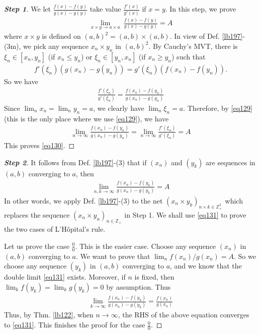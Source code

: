 \documentclass[12pt,b5paper,notitlepage]{article}
\theoremstyle{definition}
\theoremstyle{plain}
\newcommand{\Zbb}{\mathbb Z}
\newcommand{\dps}{\displaystyle}
\numberwithin{equation}{section}
\begin{document}
\begin{proof}[\textbf{Step 1}]
We let $\dps\frac{f(x)-f(y)}{g(x)-g(y)}$ take value $\dps\frac{f'(x)}{g'(x)}$ if $x=y$. In this step, we prove
\begin{align}\label{eq130}
\lim_{x\times y\rightarrow a\times a}~\frac{f(x)-f(y)}{g(x)-g(y)}=A
\end{align}
where $x\times y$ is defined on $(a,b)^2=(a,b)\times (a,b)$. In view of Def. \ref{lb197}-(3m), we pick any sequence $x_n\times y_n$ in $(a,b)^2$. By Cauchy's MVT, there is $\xi_n \in [x_n,y_n]$ (if $x_n\leq y_n$) or $\xi_n\in[y_n,x_n]$ (if $x_n\geq y_n$) such that
\begin{align*}
f'(\xi_n)(g(x_n)-g(y_n))=g'(\xi_n)(f(x_n)-f(y_n)).
\end{align*} 
So we have
\begin{align*}
    \frac{f'(\xi_n)}{g'(\xi_n)}=\frac{f(x_n)-f(y_n)}{g(x_n)-g(y_n)} 
\end{align*}
Since $\lim_n x_n=\lim_n y_n=a$, we clearly have $\lim_n \xi_n=a$.  Therefore, by \eqref{eq129} (this is the only place where we use \eqref{eq129}), we have
\begin{align*}
\lim_{n\rightarrow\infty} \frac{f(x_n)-f(y_n)}{g(x_n)-g(y_n)}=\lim_{n\rightarrow\infty}\frac{f'(\xi_n)}{g'(\xi_n)}=A
\end{align*}
This proves \eqref{eq130}.
\end{proof}





\begin{proof}[\textbf{Step 2}]
It follows from Def. \ref{lb197}-(3) that if $(x_n)$ and $(y_k)$ are sequences in $(a,b)$ converging to $a$, then
\begin{align}
\lim_{n,k\rightarrow\infty} \frac{f(x_n)-f(y_k)}{g(x_n)-g(y_k)}=A \label{eq131}
\end{align}  
In other words, we apply Def. \ref{lb197}-(3) to the net $(x_n\times y_k)_{n\times k\in\Zbb_+^2}$ which replaces the sequence $(x_n\times y_n)_{n\in\Zbb_+}$ in Step 1. We shall use \eqref{eq131} to prove the two cases of L'H\^opital's rule.


Let us prove the case $\frac 00$. This is the easier case. Choose any sequence $(x_n)$ in $(a,b)$ converging to $a$. We want to prove that $\lim_n f(x_n)/g(x_n)=A$. So we choose any sequence $(y_k)$ in $(a,b)$ converging to $a$, and we know that the double limit \eqref{eq131} exists. Moreover, if $n$ is fixed, then $\lim_k f(y_k)=\lim_k g(y_k)=0$ by assumption. Thus
\begin{align}
\lim_{k\rightarrow\infty}\frac{f(x_n)-f(y_k)}{g(x_n)-g(y_k)}=\frac{f(x_n)}{g(x_n)} \label{eq134}
\end{align}
Thus, by Thm. \ref{lb122}, when $n\rightarrow\infty$, the RHS of the above equation converges to \eqref{eq131}. This finishes the proof for the case $\frac 00$.
\end{proof}
\end{document}
